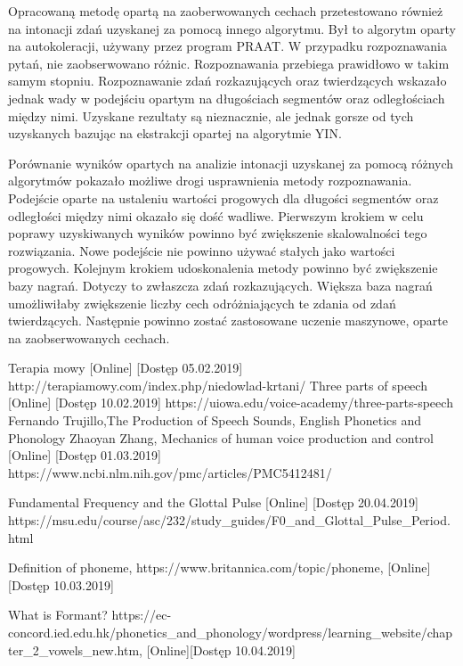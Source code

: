 \documentclass[a4paper,12 pt]{report}
\begin{document}
Opracowaną metodę opartą na zaoberwowanych cechach przetestowano również na intonacji zdań uzyskanej za pomocą innego algorytmu. Był to algorytm oparty na autokoleracji, używany przez program PRAAT.
W przypadku rozpoznawania pytań, nie zaobserwowano różnic. Rozpoznawania przebiega prawidłowo w takim samym stopniu.
Rozpoznawanie zdań rozkazujących oraz twierdzących wskazało jednak wady w podejściu opartym na długościach segmentów oraz odległościach między nimi. Uzyskane rezultaty są nieznacznie, ale jednak gorsze od tych uzyskanych bazując na ekstrakcji opartej na algorytmie YIN.

Porównanie wyników opartych na analizie intonacji uzyskanej za pomocą różnych algorytmów pokazało możliwe drogi usprawnienia metody rozpoznawania. Podejście oparte na ustaleniu wartości progowych dla długości segmentów oraz odległości między nimi okazało się dość wadliwe. Pierwszym krokiem w celu poprawy uzyskiwanych wyników powinno być zwiększenie skalowalności tego rozwiązania. Nowe podejście nie powinno używać stałych jako wartości progowych.
Kolejnym krokiem udoskonalenia metody powinno być zwiększenie bazy nagrań. Dotyczy to zwłaszcza zdań rozkazujących. Większa baza nagrań umożliwiłaby zwiększenie liczby cech odróżniających te zdania od zdań twierdzących. Następnie powinno zostać zastosowane uczenie maszynowe, oparte na zaobserwowanych cechach.
\newpage

\begin{thebibliography}{99}
Terapia mowy [Online] [Dostęp 05.02.2019]
http://terapiamowy.com/index.php/niedowlad-krtani/
Three parts of speech [Online] [Dostęp 10.02.2019]
https://uiowa.edu/voice-academy/three-parts-speech
 Fernando Trujillo,The Production of Speech Sounds, English Phonetics and Phonology
Zhaoyan Zhang, Mechanics of human voice production and control [Online] [Dostęp 01.03.2019]
https://www.ncbi.nlm.nih.gov/pmc/articles/PMC5412481/

Fundamental Frequency and the Glottal Pulse [Online] [Dostęp 20.04.2019]
https://msu.edu/course/asc/232/study\_guides/F0\_and\_Glottal\_Pulse\_Period.html

 



Definition of phoneme, https://www.britannica.com/topic/phoneme, [Online][Dostęp 10.03.2019]





What is Formant? https://ec-concord.ied.edu.hk/phonetics\_and\_phonology/wordpress/learning\_website/chapter\_2\_vowels\_new.htm, [Online][Dostęp 10.04.2019]


\end{thebibliography}
\end{document}
